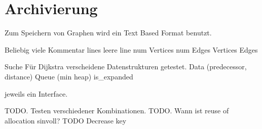 \section{Archivierung}

Zum Speichern von Graphen wird ein Text Based Format benutzt.


Beliebig viele Kommentar lines
leere line
num Vertices
num Edges
Vertices
Edges

Suche
Für Dijkstra verscheidene Datenstrukturen getestet.
Data (predecessor, distance)
Queue (min heap)
is\_expanded

jeweils ein Interface.

TODO. Testen verschiedener Kombinationen.
TODO. Wann ist reuse of allocation sinvoll?
TODO Decrease key


